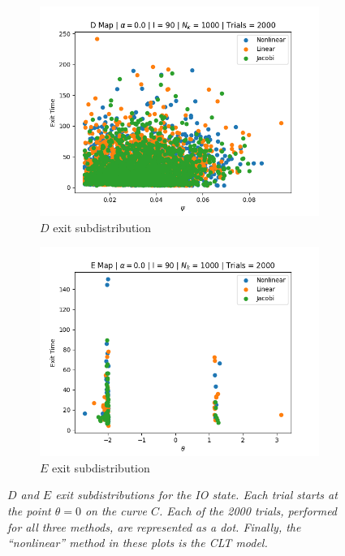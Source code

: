\documentclass[letterpaper,12pt]{article}
\numberwithin{table}{section}
\numberwithin{figure}{section}
\numberwithin{equation}{section}
\newcommand{\ccaption}[1]{\caption{\textit{#1}}}
\begin{document}
\begin{flushleft}
\begin{figure}[!h]
        \begin{subfigure}{0.72\textwidth}
            \includegraphics[width=\linewidth]{img/dmap.jpg}
            \caption{$D$ exit subdistribution}
        \end{subfigure}
    
        \begin{subfigure}{0.72\textwidth}
            \includegraphics[width=\linewidth]{img/emap.jpg}
            \caption{$E$ exit subdistribution}
        \end{subfigure}
        
        \captionsetup{width=\linewidth}
        \ccaption{$D$ and $E$ exit subdistributions for the IO state. Each trial starts at the point $\theta = 0$ on the curve $C$. Each of the 2000 trials, performed for all three methods, are represented as a dot. Finally, the ``nonlinear'' method in these plots is the CLT model.}
        \label{fig:de-map}


\end{figure}
\end{flushleft}
\end{document}
